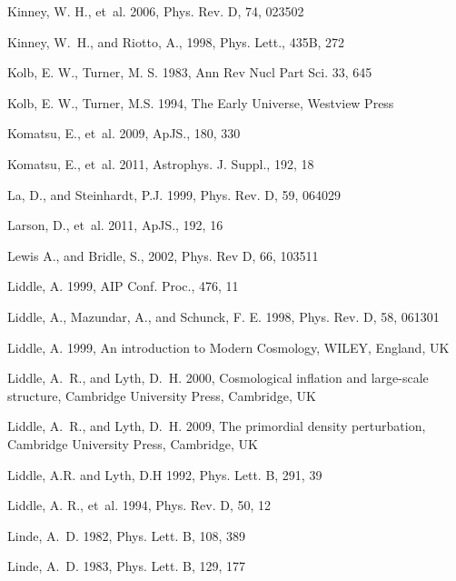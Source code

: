 \documentclass{rmaa}
\begin{document}
\begin{thebibliography}
 Kinney, W. H.,  et~al. 2006, Phys. Rev. D, 74, 023502

 Kinney, W.~H., and {Riotto}, A.,  1998, Phys. Lett., 435B, 272

Kolb, E. W., Turner, M. S. 1983, Ann Rev Nucl Part Sci. 33, 645
  
Kolb, E. W., Turner, M.S. 1994, The Early Universe, Westview Press  

  Komatsu, E., et~al. 2009, ApJS., 180, 330 
  
Komatsu, E., et~al. 2011, Astrophys. J. Suppl., 192, 18

  La, D., and {Steinhardt}, P.J.  1999, Phys. Rev. D, 59, 064029
 
Larson, D., et~al. 2011, ApJS., 192, 16

Lewis A., and Bridle, S., 2002, Phys. Rev D, 66, 103511 
   
  Liddle, A. 1999, AIP Conf. Proc., 476, 11

 Liddle, A.,  {Mazundar,} A., and {Schunck,} F. E. 1998, Phys. Rev. D, 58, 061301  

Liddle, A. 1999, An introduction to Modern Cosmology, WILEY, England, UK

 Liddle, A.~R., and  Lyth, D.~H. 2000, Cosmological inflation and large-scale structure,
  Cambridge University Press, Cambridge, UK 

 Liddle, A.~R., and  Lyth, D.~H. 2009, The primordial density perturbation,
  Cambridge University Press, Cambridge, UK 
  
 Liddle, A.R. and Lyth, D.H 1992, Phys. Lett. B, 291, 39

  Liddle, A. R., et~al. 1994, Phys. Rev. D, 50, 12
  
Linde, A.~D. 1982, Phys. Lett. B, 108,  389 
 
 Linde, A.~D. 1983, Phys. Lett. B, 129, 177 


\end{thebibliography}
\end{document}
